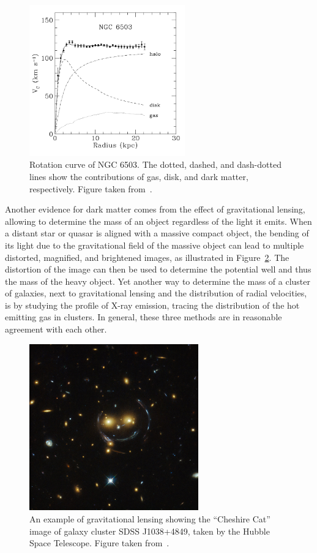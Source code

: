 \begin{figure}[ht]
  \centering
  \includegraphics[width=0.6\textwidth]{rotational_curve.png}\hfill%
  \caption{Rotation curve of NGC 6503. The dotted, dashed, and dash-dotted lines show the contributions of gas, disk, and dark matter, respectively. Figure taken from~\cite{Begeman:1991iy}.}
  \label{fig:rotationcurves}
\end{figure}

Another evidence for dark matter comes from the effect of gravitational lensing, allowing to determine the mass of an object regardless of the light it emits. When a distant star or quasar is aligned with a massive compact object, the bending of its light due to the gravitational field of the massive object can 
lead to multiple distorted, magnified, and brightened images, as illustrated in Figure~\ref{fig:gravitational_lensing}. The distortion of the image can then be used to determine the potential well and thus the mass of the heavy object. Yet another way to determine the mass of a cluster of galaxies, next to gravitational lensing and the distribution of radial velocities, is by studying the profile of X-ray emission, tracing the distribution of the hot emitting gas in clusters. In general, these three methods are in reasonable agreement with each other.

\begin{figure}[ht]
  \centering
  \includegraphics[width=0.65\textwidth]{cat.jpg}\hfill%
  \caption{An example of gravitational lensing showing the ``Cheshire Cat'' image of galaxy cluster  SDSS J1038+4849, taken by the Hubble Space Telescope. Figure taken from~\cite{Belokurov:2008pu}.}
  \label{fig:gravitational_lensing}
\end{figure}

